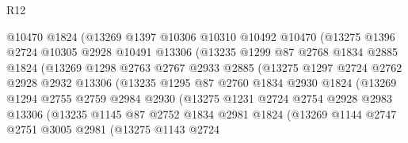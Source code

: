 \begin{lexlean}{R12}
\begin{coremodule}
                    @10470
                    @1824
                    (@13269
                      @1397
                      @10306
                      @10310
                      @10492
                      @10470
                      (@13275
                        @1396
                        @2724
                        @10305
                        @2928
                        @10491
                        @13306
                        (@13235
                          @1299
                          @87
                          @2768
                          @1834
                          @2885
                          @1824
                          (@13269
                            @1298
                            @2763
                            @2767
                            @2933
                            @2885
                            (@13275
                              @1297
                              @2724
                              @2762
                              @2928
                              @2932
                              @13306
                              (@13235
                                @1295
                                @87
                                @2760
                                @1834
                                @2930
                                @1824
                                (@13269
                                  @1294
                                  @2755
                                  @2759
                                  @2984
                                  @2930
                                  (@13275
                                    @1231
                                    @2724
                                    @2754
                                    @2928
                                    @2983
                                    @13306
                                    (@13235
                                      @1145
                                      @87
                                      @2752
                                      @1834
                                      @2981
                                      @1824
                                      (@13269
                                        @1144
                                        @2747
                                        @2751
                                        @3005
                                        @2981
                                        (@13275
                                          @1143
                                          @2724

\end{coremodule}
\end{lexlean}
